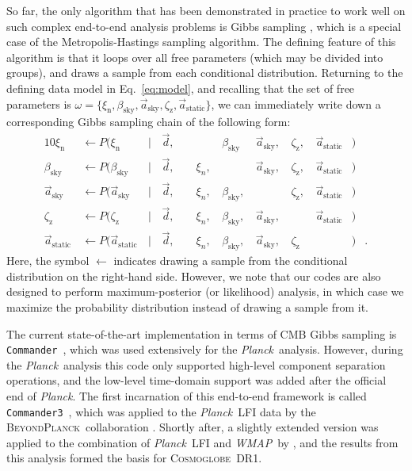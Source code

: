 \documentclass{aa}
\def\Cosmoglobe{\textsc{Cosmoglobe}}
\def\commanderthree{\texttt{Commander3}}
\def\commander{\texttt{Commander}}
\def\Planck{\textit{Planck}}
\def\WMAP{\textit{WMAP}}
\newcommand{\dv}[0]{\vec{d}}
\renewcommand{\a}[0]{\vec{a}}
\newcommand{\BP}{\textsc{BeyondPlanck}}
\begin{document}
So far, the only algorithm that has been demonstrated in practice to
work well on such complex end-to-end analysis problems
\citep{bp01,watts2023_dr1} is Gibbs sampling
\citep[e.g.,][]{geman:1984}, which is a special case of the
Metropolis-Hastings sampling algorithm. The defining
feature of this algorithm is that it loops over all free parameters
(which may be divided into groups), and draws a sample from each
conditional distribution. Returning to the defining data model in
Eq.~\eqref{eq:model}, and recalling that the set of
free parameters is $\omega = \{\xi_{\mathrm{n}},
\beta_{\mathrm{sky}},\a_{\mathrm{sky}},\zeta_{\mathrm{z}},\a_{\mathrm{static}}\}$,
we can immediately write down a corresponding Gibbs sampling chain of
the following form:
\begin{alignat}{10}
\xi_{\mathrm{n}} &\,\leftarrow P(\xi_{\mathrm{n}}&\,\mid &\,\dv,&\, &\,\phantom{\xi_n} &
\,\beta_{\mathrm{sky}}& \,\a_{\mathrm{sky}}, &\,\zeta_{\mathrm{z}},
&\,\a_{\mathrm{static}}&)\label{eq:gibbs_n}\\
\beta_{\mathrm{sky}} &\,\leftarrow P(\beta_{\mathrm{sky}}&\,\mid &\,\dv,&\, &\,\xi_n, &
\,\phantom{\beta_{\mathrm{sky}}}& \,\a_{\mathrm{sky}}, &\,\zeta_{\mathrm{z}}, &\,\a_{\mathrm{static}}&)\\
\a_{\mathrm{sky}} &\,\leftarrow P(\a_{\mathrm{sky}}&\,\mid &\,\dv,&\, &\,\xi_n, &
\,\beta_{\mathrm{sky}},& \,\phantom{\a_{\mathrm{sky}},}
&\,\zeta_{\mathrm{z}}, &\,\a_{\mathrm{static}}&)\\
\zeta_{\mathrm{z}} &\,\leftarrow P(\zeta_{\mathrm{z}}&\,\mid &\,\dv,&\, &\,\xi_n, &
\,\beta_{\mathrm{sky}},& \,\a_{\mathrm{sky}},
&\,\phantom{\zeta_{\mathrm{z}},} &\,\a_{\mathrm{static}}&)\label{eq:gibbs_zodi}\\
\a_{\mathrm{static}} &\,\leftarrow P(\a_{\mathrm{static}}&\,\mid &\,\dv,&\, &\,\xi_n, &
	\,\beta_{\mathrm{sky}},& \,\a_{\mathrm{sky}}, &\,\zeta_{\mathrm{z}} &\,\phantom{\a_{\mathrm{static}}}&)&.\label{eq:gibbs_static}
\end{alignat}
Here, the symbol $\leftarrow$ indicates drawing a sample from the
conditional distribution on the right-hand side. However, we note that
our codes are also designed to perform maximum-posterior (or
likelihood) analysis, in which case we maximize the probability
distribution instead of drawing a sample from it.

The current state-of-the-art implementation in terms of CMB Gibbs sampling
is \commander\ \citep{Eriksen:2004ss}, which was used
extensively for the \Planck\ analysis. However, during the
\Planck\ analysis this code only supported high-level component
separation operations, and the low-level time-domain support was added
after the official end of \Planck. The first incarnation of this
end-to-end framework is called \commanderthree\ \citep{bp03}, which
was applied to the \Planck\ LFI data by the \BP\ collaboration
\citep{bp01}. Shortly after, a slightly extended version was applied
to the combination of \Planck\ LFI and \WMAP\ by
\citet{watts2023_dr1}, and the results from this analysis formed the
basis for \Cosmoglobe\ DR1. 
\end{document}
